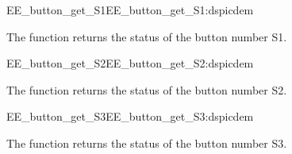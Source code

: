 \begin{function_nopb2}{EE\_button\_get\_S1}{EE_button_get_S1:dspicdem}
  
  \begin{fundescription}
    The function returns the status of the button number S1.
  \end{fundescription}
  
  
  \begin{funreturn}
  \end{funreturn}
  
\end{function_nopb2}

\begin{function_nopb2}{EE\_button\_get\_S2}{EE_button_get_S2:dspicdem}
  
  \begin{fundescription}
    The function returns the status of the button number S2.
  \end{fundescription}
  
  
  \begin{funreturn}
  \end{funreturn}
  
\end{function_nopb2}

\begin{function_nopb2}{EE\_button\_get\_S3}{EE_button_get_S3:dspicdem}
  
  \begin{fundescription}
    The function returns the status of the button number S3.
  \end{fundescription}
  
  
  \begin{funreturn}
  \end{funreturn}
  
\end{function_nopb2}

